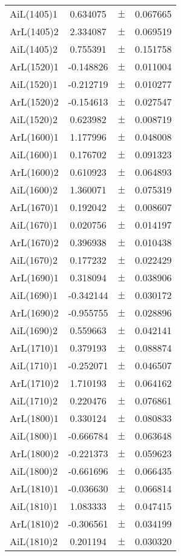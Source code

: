 \begin{table}
\begin{tiny}
\begin{tabular}{lccc}
AiL(1405)1 & 0.634075 & $\pm$ & 0.067665 \\
ArL(1405)2 & 2.334087 & $\pm$ & 0.069519 \\
AiL(1405)2 & 0.755391 & $\pm$ & 0.151758 \\
ArL(1520)1 & -0.148826 & $\pm$ & 0.011004 \\
AiL(1520)1 & -0.212719 & $\pm$ & 0.010277 \\
ArL(1520)2 & -0.154613 & $\pm$ & 0.027547 \\
AiL(1520)2 & 0.623982 & $\pm$ & 0.008719 \\
ArL(1600)1 & 1.177996 & $\pm$ & 0.048008 \\
AiL(1600)1 & 0.176702 & $\pm$ & 0.091323 \\
ArL(1600)2 & 0.610923 & $\pm$ & 0.064893 \\
AiL(1600)2 & 1.360071 & $\pm$ & 0.075319 \\
ArL(1670)1 & 0.192042 & $\pm$ & 0.008607 \\
AiL(1670)1 & 0.020756 & $\pm$ & 0.014197 \\
ArL(1670)2 & 0.396938 & $\pm$ & 0.010438 \\
AiL(1670)2 & 0.177232 & $\pm$ & 0.022429 \\
ArL(1690)1 & 0.318094 & $\pm$ & 0.038906 \\
AiL(1690)1 & -0.342144 & $\pm$ & 0.030172 \\
ArL(1690)2 & -0.955755 & $\pm$ & 0.028896 \\
AiL(1690)2 & 0.559663 & $\pm$ & 0.042141 \\
ArL(1710)1 & 0.379193 & $\pm$ & 0.088874 \\
AiL(1710)1 & -0.252071 & $\pm$ & 0.046507 \\
ArL(1710)2 & 1.710193 & $\pm$ & 0.064162 \\
AiL(1710)2 & 0.220476 & $\pm$ & 0.076861 \\
ArL(1800)1 & 0.330124 & $\pm$ & 0.080833 \\
AiL(1800)1 & -0.666784 & $\pm$ & 0.063648 \\
ArL(1800)2 & -0.221373 & $\pm$ & 0.059623 \\
AiL(1800)2 & -0.661696 & $\pm$ & 0.066435 \\
ArL(1810)1 & -0.036630 & $\pm$ & 0.066814 \\
AiL(1810)1 & 1.083333 & $\pm$ & 0.047415 \\
ArL(1810)2 & -0.306561 & $\pm$ & 0.034199 \\
AiL(1810)2 & 0.201194 & $\pm$ & 0.030320 \\

\end{tabular}
\end{tiny}
\end{table}
